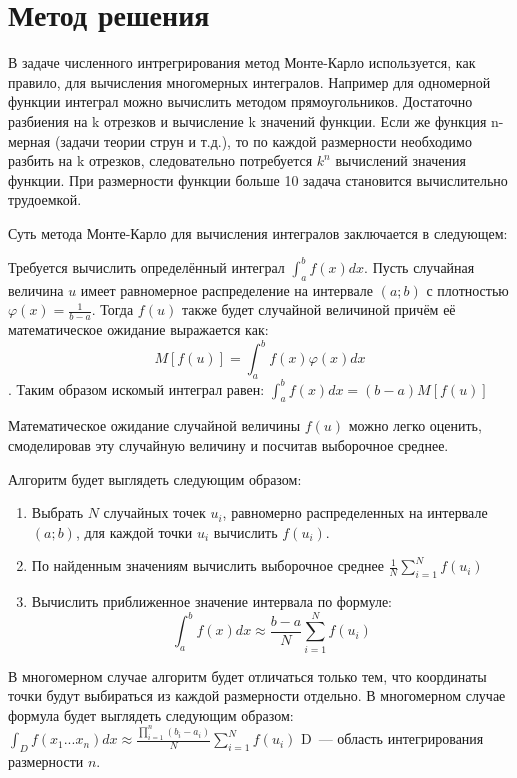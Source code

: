 \documentclass{report}
\begin{document}
\newpage

\section*{Метод решения}
В задаче численного интрегрирования метод Монте-Карло используется, как правило, для вычисления многомерных интегралов. Например для одномерной функции интеграл можно вычислить методом прямоугольников. Достаточно разбиения на k отрезков и вычисление k значений функции. Если же функция n-мерная (задачи теории струн и т.д.), то по каждой размерности необходимо разбить на k отрезков, следовательно потребуется $k^{n}$ вычислений значения функции. При размерности функции больше 10 задача становится вычислительно трудоемкой.
\par Суть метода Монте-Карло для вычисления интегралов заключается в следующем:
\par Требуется вычислить определённый интеграл $\int_{a}^{b}{f(x)dx}$. Пусть случайная величина $u$ имеет равномерное распределение на интервале $(a;b)$ с плотностью $\varphi {(x)} = \frac{1}{b-a}$. Тогда $f(u)$ также будет случайной величиной причём её математическое ожидание выражается как: \begin{equation}M[f(u)]=\int_{a}^{b}{f(x) \varphi {(x)}dx}\end{equation}. Таким образом искомый интеграл равен: $\int_{a}^{b}{f(x)dx} = (b-a)M[f(u)]$
\par Математическое ожидание случайной величины $f(u)$ можно легко оценить, смоделировав эту случайную величину и посчитав выборочное среднее.
\par Алгоритм будет выглядеть следующим образом:
\begin{enumerate}
\item Выбрать $N$ случайных точек $u_{i}$, равномерно распределенных на интервале $(a;b)$, для каждой точки $u_{i}$ вычислить $f(u_{i})$.
\item По найденным значениям вычислить выборочное среднее $\frac{1}{N}\sum_{i=1}^{N}{f(u_{i})}$
\item Вычислить приближенное значение интервала по формуле: \begin{equation}\int_{a}^{b}{f(x)dx} \approx \frac{b-a}{N}\sum_{i=1}^{N}{f(u_{i})} \end{equation}
\end{enumerate}
\par В многомерном случае алгоритм будет отличаться только тем, что координаты точки будут выбираться из каждой размерности отдельно. В многомерном случае формула будет выглядеть следующим образом: $\int_{D}^{}{f(x_{1}...x_{n})dx} \approx \frac{\prod_{i=1}^{n}{(b_{i}-a_{i})}}{N}\sum_{i=1}^{N}{f(u_{i})}$
\indent D~--- область интегрирования размерности $n$.
\newpage
\end{document}
